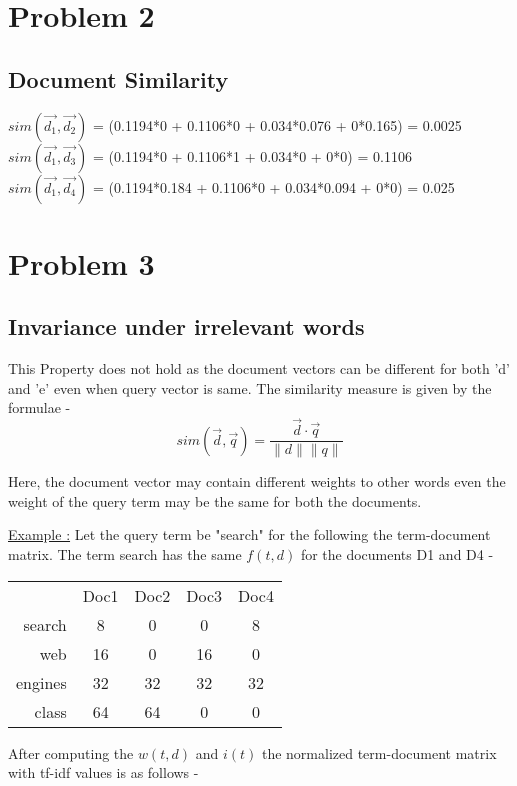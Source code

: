 \documentclass{article}
\begin{document}
\section[B]{Problem 2}
\subsection {Document Similarity}
$sim(\vec{d_1},\vec{d_2})$ = (0.1194*0 + 0.1106*0 + 0.034*0.076 + 0*0.165) = 0.0025 \\
$sim(\vec{d_1},\vec{d_3})$ = (0.1194*0 + 0.1106*1 + 0.034*0 + 0*0) = 0.1106 \\
$sim(\vec{d_1},\vec{d_4})$ = (0.1194*0.184 + 0.1106*0 + 0.034*0.094 + 0*0) = 0.025 \\


\section[C]{Problem 3}
\subsection{\textbf{Invariance under irrelevant words}}
This Property does not hold as the document vectors can be different for both 'd' and 'e' even when query vector is same. The similarity measure is given by the formulae - 
\[ sim(\vec{d},\vec{q}) = \frac{\vec{d}\cdot\vec{q}}{\| d \| \| q \|}\]

Here, the document vector may contain different weights to other words even the weight of the query term may be the same for both the documents.

\underline{Example :}
Let the query term be "search" for the following the term-document matrix. The term search has the same $f(t,d)$ for the documents D1 and D4 - 

\begin{tabular}{ r|c|c|c|c| }
\multicolumn{1}{r}{}
 & \multicolumn{1}{c}{Doc1}
 & \multicolumn{1}{c}{Doc2}
 & \multicolumn{1}{c}{Doc3}
 & \multicolumn{1}{c}{Doc4} \\
\cline{2-5}
search & 8 & 0 & 0 & 8 \\
\cline{2-5}
web & 16 & 0 & 16 & 0 \\
\cline{2-5}
engines & 32 & 32 & 32 & 32 \\
\cline{2-5}
class & 64 & 64 & 0 & 0 \\
\cline{2-5}
\end{tabular}

After computing the $w(t,d)$ and $i(t)$ the normalized term-document matrix with tf-idf values is as follows - 
\end{document}
